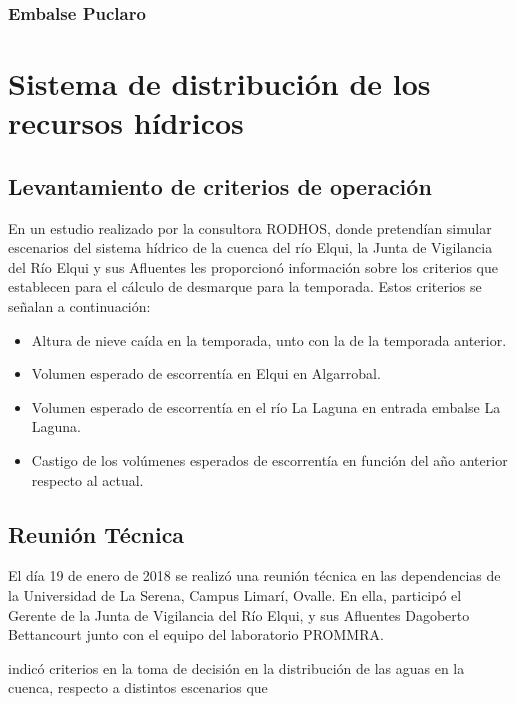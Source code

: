 \documentclass[10pt,]{article}
\begin{document}
			\subsubsection{Embalse Puclaro}\bigskip

\section{Sistema de distribución de los recursos hídricos}\bigskip

		\subsection{Levantamiento de criterios de operación}
		En un estudio realizado por la consultora RODHOS, donde pretendían simular escenarios del sistema hídrico de la cuenca del río Elqui, la Junta de Vigilancia del Río Elqui y sus Afluentes les proporcionó información sobre los criterios que establecen para el cálculo de desmarque para la temporada. Estos criterios se señalan a continuación:\bigskip
		
		\begin{itemize}
		
		\item Altura de nieve caída en la temporada, unto con la de la temporada anterior.
		\item Volumen esperado de escorrentía en Elqui en Algarrobal.
		\item Volumen esperado de escorrentía en el río La Laguna en entrada embalse La Laguna.
		\item Castigo de los volúmenes esperados de escorrentía en función del año anterior respecto al actual.
		
		\end{itemize}
		
		\subsection{Reunión Técnica}
		
		El día 19 de enero de 2018 se realizó una reunión técnica en las dependencias de la Universidad de La Serena, Campus Limarí, Ovalle. En ella, participó el Gerente de la Junta de Vigilancia del Río Elqui,  y sus Afluentes Dagoberto Bettancourt junto con el equipo del laboratorio PROMMRA.
		
		indicó criterios en la toma de decisión en la distribución de las aguas en la cuenca, respecto a distintos escenarios que 
		
\end{document}
